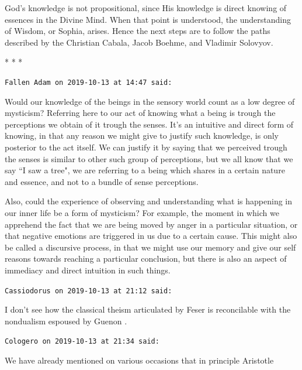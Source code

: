 God's knowledge is not propositional, since His knowledge is direct knowing of essences in the
Divine Mind. When that point is understood, the understanding of Wisdom, or Sophia, arises. Hence the next steps are to
follow the paths described by the Christian Cabala, Jacob Boehme, and Vladimir Solovyov.




\begin{center}* * *\end{center}

\begin{footnotesize}\begin{sffamily}



\texttt{Fallen Adam on 2019-10-13 at 14:47 said: }

Would our knowledge of the beings in the sensory world count as a low degree of mysticism? Referring here to our act of
knowing what a being is trough the perceptions we obtain of it trough the senses. It's an
intuitive and direct form of knowing, in that any reason we might give to justify such knowledge, is only posterior to
the act itself. We can justify it by saying that we perceived trough the senses is similar to other such group of
perceptions, but we all know that we say ``I saw a tree", we are referring to a being which shares in a certain nature
and essence, and not to a bundle of sense perceptions.

Also, could the experience of observing and understanding what is happening in our inner life be a form of mysticism?
For example, the moment in which we apprehend the fact that we are being moved by anger in a particular situation, or
that negative emotions are triggered in us due to a certain cause. This might also be called a discursive process, in
that we might use our memory and give our self reasons towards reaching a particular conclusion, but there is also an
aspect of immediacy and direct intuition in such things.


\hfill

\texttt{Cassiodorus on 2019-10-13 at 21:12 said: }

I don't see how the classical theism articulated by Feser is reconcilable with the nondualism
espoused by Guenon .


\hfill

\texttt{Cologero on 2019-10-13 at 21:34 said: }

We have already mentioned on various occasions that in principle Aristotle


\end{sffamily}
\end{footnotesize}
